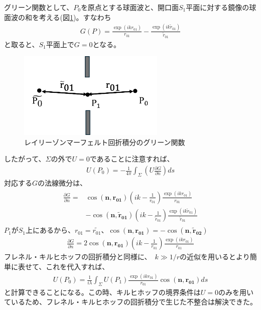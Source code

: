 \documentclass[a4paper,11pt,uplatex]{jsbook}
\begin{document}
グリーン関数として、$P_0$を原点とする球面波と、開口面$S_1$平面に対する鏡像の球面波の和を考える(図\ref{fig:diff_ray})。すなわち
\begin{eqnarray}
  G(P) = \frac{\exp(ikr_{01})}{r_{01}} -\frac{\exp(ik\tilde{r}_{01})}{\tilde{r}_{01}}
\end{eqnarray}
と取ると、$S_1$平面上で$G =0$となる。
\begin{figure}[h]
  \centering
  \includegraphics[width=7cm]{image/2-diffraction_ray.png}
  \caption[レイリーゾンマーフェルト積分の座標系]{レイリーゾンマーフェルト回折積分のグリーン関数}\label{fig:diff_ray}
\end{figure}
したがって、$\Sigma$の外で$U =0 $であることに注意すれば、
\begin{eqnarray}
  U(P_0) = -\frac{1}{4\pi}\int_{\Sigma} \left( U\frac{\partial G}{\partial n} \right) ds
\end{eqnarray}
対応する$G$の法線微分は、
\begin{eqnarray}
  \begin{split}
  \frac{\partial G}{\partial n} = &\cos(\bm{n},\bm{r_{01}})\left(ik - \frac{1}{r_{01}}\right)\frac{\exp(ikr_{01})}{r_{01}} \\
  &- \cos(\bm{n},\bm{\tilde{r}_{01}})\left(ik - \frac{1}{\tilde{r}_{01}}\right)\frac{\exp(ik\tilde{r}_{01})}{\tilde{r}_{01}}
  \end{split}
\end{eqnarray}
$P_1$が$S_1$上にあるから、$r_{01} = \tilde{r_{01}}$、$\cos(\bm{n},\bm{r_{01}}) = -\cos(\bm{n},\bm{\tilde{r}_{02}})$
\begin{eqnarray}
  \frac{\partial G}{\partial n} = 2\cos(\bm{n},\bm{r_{01}})\left(ik - \frac{1}{r_{01}}\right)\frac{\exp(ikr_{01})}{r_{01}}
\end{eqnarray}
フレネル・キルヒホッフの回折積分と同様に、~$k \gg 1/r$の近似を用いるとより簡単に表せて、これを代入すれば、
\begin{eqnarray}
  U(P_0) = \frac{1}{i\lambda}\int_{\Sigma} U(P_1)\frac{\exp(ikr_{01})}{r_{01}}\cos(\bm{n},\bm{r_{01}})ds
\end{eqnarray}
と計算できることになる。この時、キルヒホッフの境界条件は$U=0$のみを用いているため、フレネル・キルヒホッフの回折積分で生じた不整合は解決できた。
\end{document}
